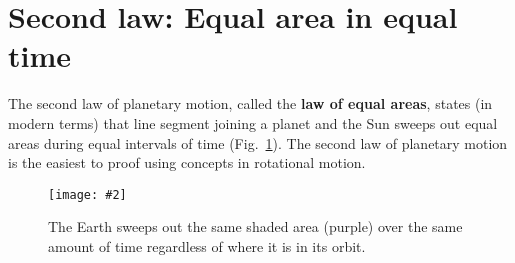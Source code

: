 \documentclass{../../../oss-handout}
\newcommand{\pic}[2]{\texttt{[image: \#2]}}
\begin{document}
\section{Second law: Equal area in equal time}

The second law of planetary motion, called the \textbf{law of equal areas},
states (in modern terms) that line segment joining a planet and the Sun sweeps
out equal areas during equal intervals of time (Fig.~\ref{kep2}). The second
law of planetary motion is the easiest to proof using concepts in rotational
motion.
\begin{figure}[!ht]
  \centering
    \pic{.4}{../201532-132212364-3243-planet.png}
    \caption{The Earth sweeps out the same shaded area (purple) over the
      same amount of time regardless of where it is in its orbit.}
    \label{kep2}
\end{figure}
\end{document}
